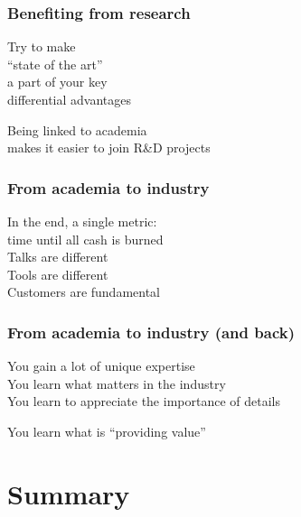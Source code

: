 \documentclass[17pt,aspectratio=169,hyperref=pdfusetitle]{beamer}
\begin{document}
\begin{frame}[fragile]
  \frametitle{Benefiting from research}

  Try to make \\
  ``state of the art'' \\
  a part of your key \\
  differential advantages \\

  \begin{flushright}
    Being linked to academia \\
    makes it easier to join R\&D projects \\
  \end{flushright}
\end{frame}

\begin{frame}[fragile]
  \frametitle{From academia to industry}

  In the end, a single metric: \\
  time until all cash is burned \\
  \vspace{1cm}
  Talks are different \\
  Tools are different \\
  Customers are fundamental \\
\end{frame}

\begin{frame}[fragile]
  \frametitle{From academia to industry (and back)}

  You gain a lot of unique expertise \\
  You learn what matters in the industry \\
  You learn to appreciate the importance of details \\
  \vspace{1cm}
  \begin{flushright}
    You learn what is
    ``providing value''
  \end{flushright}
\end{frame}

\section{Summary}
\end{document}
